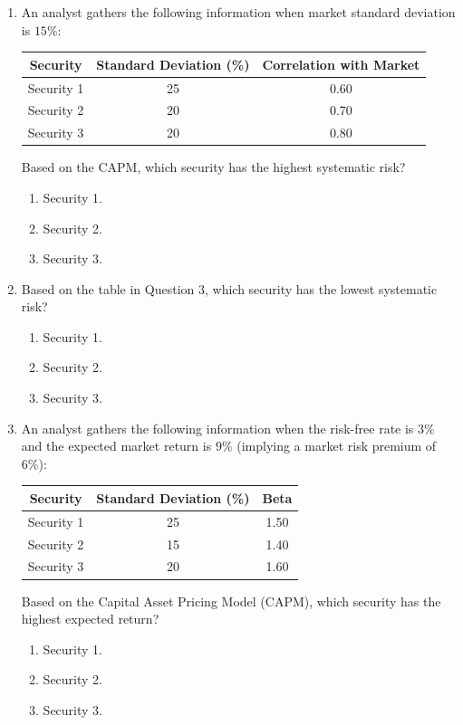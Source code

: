 \begin{enumerate}
	\item An analyst gathers the following information when market standard deviation is $15\%$:
	      \begin{center}
	      \begin{tabular}{c  c  c}
		      \toprule
		      \textbf{Security} & \textbf{Standard Deviation (\%)} & \textbf{Correlation with Market} \\
		      \midrule
		      Security 1 & 25 & 0.60 \\
		      Security 2 & 20 & 0.70 \\
		      Security 3 & 20 & 0.80 \\
		      \bottomrule
	      \end{tabular}
	      \end{center}
	      Based on the CAPM, which security has the highest systematic risk?
	      \begin{enumerate}[label=\Alph*.]
		      \item Security 1.
		      \item Security 2.
		      \item Security 3.
	      \end{enumerate}

	\item Based on the table in Question 3, which security has the lowest systematic risk?
	      \begin{enumerate}[label=\Alph*.]
		      \item Security 1.
		      \item Security 2.
		      \item Security 3.
	      \end{enumerate}

	\item An analyst gathers the following information when the risk-free rate is $3\%$ and the expected market return is $9\%$ (implying a market risk premium of 6\%):
	      \begin{center}
	      \begin{tabular}{c  c  c}
		      \toprule
		      \textbf{Security} & \textbf{Standard Deviation (\%)} & \textbf{Beta} \\
		      \midrule
		      Security 1 & 25 & 1.50 \\
		      Security 2 & 15 & 1.40 \\
		      Security 3 & 20 & 1.60 \\
		      \bottomrule
	      \end{tabular}
	      \end{center}
	      Based on the Capital Asset Pricing Model (CAPM), which security has the highest expected return?
	      \begin{enumerate}[label=\Alph*.]
		      \item Security 1.
		      \item Security 2.
		      \item Security 3.
	      \end{enumerate}


\end{enumerate}
